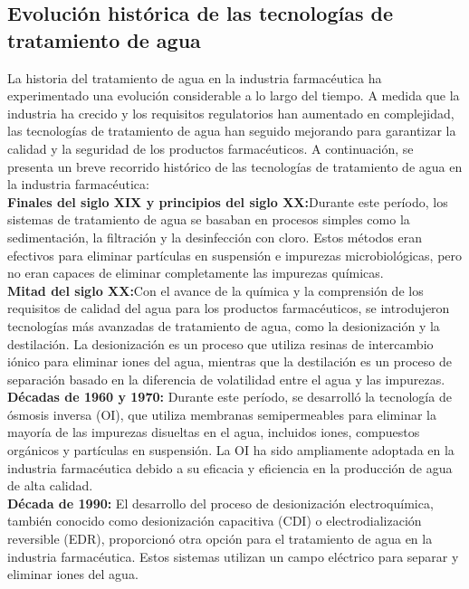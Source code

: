 \subsection{Evolución histórica de las tecnologías de tratamiento de agua}

La historia del tratamiento de agua en la industria farmacéutica ha experimentado una evolución considerable a lo largo del tiempo. A medida que la industria ha crecido y los requisitos regulatorios han aumentado en complejidad, las tecnologías de tratamiento de agua han seguido mejorando para garantizar la calidad y la seguridad de los productos farmacéuticos. A continuación, se presenta un breve recorrido histórico de las tecnologías de tratamiento de agua en la industria farmacéutica:\\

\textbf{Finales del siglo XIX y principios del siglo XX:}Durante este período, los sistemas de tratamiento de agua se basaban en procesos simples como la sedimentación, la filtración y la desinfección con cloro. Estos métodos eran efectivos para eliminar partículas en suspensión e impurezas microbiológicas, pero no eran capaces de eliminar completamente las impurezas químicas.\\

\textbf{Mitad del siglo XX:}Con el avance de la química y la comprensión de los requisitos de calidad del agua para los productos farmacéuticos, se introdujeron tecnologías más avanzadas de tratamiento de agua, como la desionización y la destilación. La desionización es un proceso que utiliza resinas de intercambio iónico para eliminar iones del agua, mientras que la destilación es un proceso de separación basado en la diferencia de volatilidad entre el agua y las impurezas.\\

\textbf{Décadas de 1960 y 1970:} Durante este período, se desarrolló la tecnología de ósmosis inversa (OI), que utiliza membranas semipermeables para eliminar la mayoría de las impurezas disueltas en el agua, incluidos iones, compuestos orgánicos y partículas en suspensión. La OI ha sido ampliamente adoptada en la industria farmacéutica debido a su eficacia y eficiencia en la producción de agua de alta calidad.\\

\textbf{Década de 1990:} El desarrollo del proceso de desionización electroquímica, también conocido como desionización capacitiva (CDI) o electrodialización reversible (EDR), proporcionó otra opción para el tratamiento de agua en la industria farmacéutica. Estos sistemas utilizan un campo eléctrico para separar y eliminar iones del agua.\\

